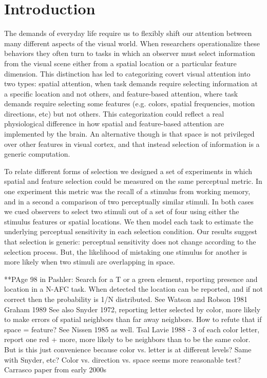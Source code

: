 
\section{Introduction}

The demands of everyday life require us to flexibly shift our attention between many different aspects of the visual world. When researchers operationalize these behaviors they often turn to tasks in which an observer must select information from the visual scene either from a spatial location or a particular feature dimension. This distinction has led to categorizing covert visual attention into two types: spatial attention, when task demands require selecting information at a specific location and not others, and feature-based attention, where task demands require selecting some features (e.g. colors, spatial frequencies, motion directions, etc) but not others. This categorization could reflect a real physiological difference in how spatial and feature-based attention are implemented by the brain. An alternative though is that space is not privileged over other features in visual cortex, and that instead selection of information is a generic computation.

To relate different forms of selection we designed a set of experiments in which spatial and feature selection could be measured on the same perceptual metric. In one experiment this metric was the recall of a stimulus from working memory, and in a second a comparison of two perceptually similar stimuli. In both cases we cued observers to select two stimuli out of a set of four using either the stimulus features or spatial locations. We then model each task to estimate the underlying perceptual sensitivity in each selection condition. Our results suggest that selection is generic: perceptual sensitivity does not change according to the selection process. But, the likelihood of mistaking one stimulus for another is more likely when two stimuli are overlapping in space.


**PAge 98 in Pashler:
Search for a T or a green element, reporting presence and location in a N-AFC task. When detected the location can be reported, and if not correct then the probability is 1/N distributed. 
See Watson and Robson 1981
Graham 1989
See also Snyder 1972, reporting letter selected by color, more likely to make errors of spatial neighbors than far away neighbors. How to refute that if space = feature? See Nissen 1985 as well.
Tsal Lavie 1988 - 3 of each color letter, report one red + more, more likely to be neighbors than to be the same color. But is this just convenience because color vs. letter is at different levels? Same with Snyder, etc? Color vs. direction vs. space seems more reasonable test?
Carrasco paper from early 2000s


